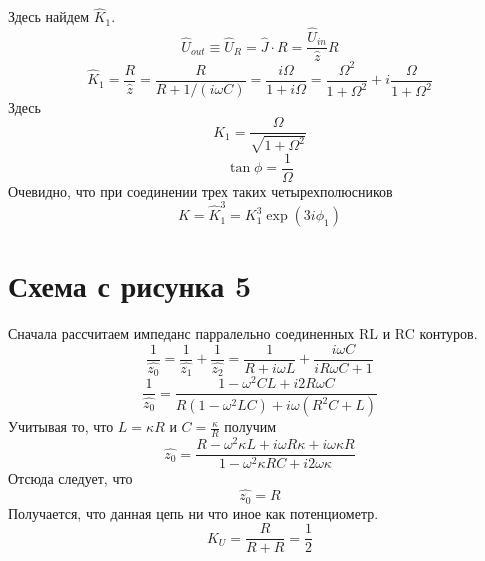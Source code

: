 Здесь найдем $\hat{K}_1$.
\begin{equation}
	\hat{U}_{out}\equiv\hat{U}_R=\hat{J}\cdot R=
	\frac{\hat{U}_{in}}{\hat{z}}R
\end{equation}
\begin{equation}
	\hat{K}_1=\frac{R}{\hat{z}}=\frac{R}{R+1/(i\omega C)}=\frac{i\Omega}{1+i\Omega}=
	\frac{\Omega^2}{1+\Omega^2}+i\frac{\Omega}{1+\Omega^2}
\end{equation}
Здесь
\begin{equation}
	K_1=\frac{\Omega}{\sqrt{1+\Omega^2}}
\end{equation}
\begin{equation}
	\tan\phi=\frac{1}{\Omega}
\end{equation}
Очевидно, что при соединении трех таких четырехполюсников 
\begin{equation}
	\hat{K}=\hat{K}_1^3=K_1^3\exp(3i\phi_1)
\end{equation}

\section{Схема с рисунка 5}
\begin{center}

\end{center}

Сначала рассчитаем импеданс парралельно соединенных RL и RC контуров.
\begin{equation}
	\frac{1}{\hat{z_0}}=\frac{1}{\hat{z_1}}+\frac{1}{\hat{z_2}}=\frac{1}{R+i\omega L}+\frac{i\omega C}{iR\omega C+1}
\end{equation}
\begin{equation}
\frac{1}{\hat{z_0}}=\frac{1-\omega^2 CL+i2R\omega C}{R(1-\omega^2 LC)+i\omega(R^2C+L)}
\end{equation}
Учитывая то, что $L=\kappa R$ и $C=\frac{\kappa}{R}$ получим
\begin{equation}
	\hat{z_0}=\frac{R-\omega^2\kappa L+i\omega R\kappa +i\omega \kappa R}{1-\omega^2\kappa RC+i2\omega\kappa}
\end{equation}
Отсюда следует, что
\begin{equation}
	\hat{z_0}=R
\end{equation}
Получается, что данная цепь ни что иное как потенциометр. 
\begin{equation}
	K_U=\frac{R}{R+R}=\frac{1}{2}
\end{equation}
